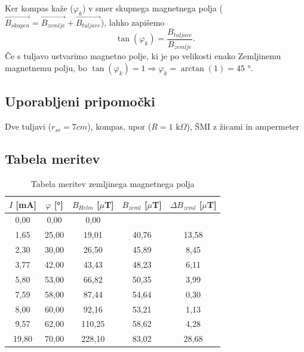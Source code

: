 \documentclass[12pt]{article}
\begin{document}
	Ker kompas kaže ($\varphi_k$) v smer skupnega magnetnega polja
	($\vec{B_{skupen}} = \vec{B_{zemlje}} + \vec{B_{tuljave}}$), lahko zapišemo
	\begin{equation}
		\tan(\varphi_k) = \frac{B_{tuljave}}{B_{zemlje}} .
	\end{equation}
	Če s tuljavo ustvarimo magnetno polje, ki je po velikosti enako Zemljinemu magnetnemu
	polju, bo $\tan(\varphi_k) = 1 \Rightarrow \varphi_k = \arctan(1) = 45 \text{ °}$.

	\subsection*{Uporabljeni pripomočki}
	Dve tuljavi ($r_{sr} = 7 cm$), kompas, upor ($R = 1 \text{ k}\Omega$), ŠMI z žicami in
	ampermeter
	\subsection*{Tabela meritev}
	\begin{table}[h!]
		\centering
		\begin{tabular}{|c|c|c|c|c|}
		\hline
		$I$ [mA] & $\varphi$ [°] & $B_{Helm}$ [$\mu$T] & $B_{zeml}$ [$\mu$T] & $\Delta B_{zeml}$ [$\mu$T] \\ \hline
		0,00     & 0,00          & 0,00                   &                        &                               \\ \hline
		1,65     & 25,00         & 19,01                  & 40,76                  & 13,58                         \\ \hline
		2,30     & 30,00         & 26,50                  & 45,89                  & 8,45                          \\ \hline
		3,77     & 42,00         & 43,43                  & 48,23                  & 6,11                          \\ \hline
		5,80     & 53,00         & 66,82                  & 50,35                  & 3,99                          \\ \hline
		7,59     & 58,00         & 87,44                  & 54,64                  & 0,30                          \\ \hline
		8,00     & 60,00         & 92,16                  & 53,21                  & 1,13                          \\ \hline
		9,57     & 62,00         & 110,25                 & 58,62                  & 4,28                          \\ \hline
		19,80    & 70,00         & 228,10                 & 83,02                  & 28,68                         \\ \hline
		\end{tabular}
		\caption{Tabela meritev zemljinega magnetnega polja}
	\end{table}
\end{document}
